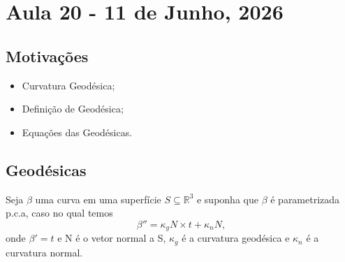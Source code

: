 \documentclass[../differential_geometry.tex]{subfiles}
\begin{document}
\section{Aula 20 - 11 de Junho, 2026}
\subsection{Motivações}
\begin{itemize}
	\item Curvatura Geodésica;
	\item Definição de Geodésica;
	\item Equações das Geodésicas.
\end{itemize}
\subsection{Geodésicas}
Seja \(\beta \) uma curva em uma superfície \(S\subseteq \mathbb{R}^{3}\) e suponha que \(\beta \) é parametrizada p.c.a, caso no qual temos
\[
	\beta''=\kappa_{g} N\times t + \kappa_{n}N,
\]
onde \(\beta'=t\) e N é o vetor normal a S, \(\kappa_{g}\) é a curvatura geodésica e \(\kappa_{n}\) é a curvatura normal.
\end{document}
